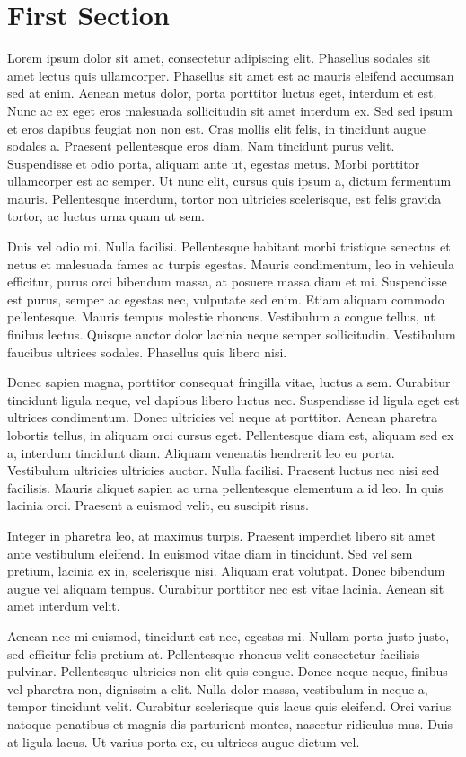 \documentclass{report}
\begin{document}
	\section{First Section}
	
	Lorem ipsum dolor sit amet, consectetur adipiscing elit. Phasellus sodales sit amet lectus quis ullamcorper. Phasellus sit amet est ac mauris eleifend accumsan sed at enim. Aenean metus dolor, porta porttitor luctus eget, interdum et est. Nunc ac ex eget eros malesuada sollicitudin sit amet interdum ex. Sed sed ipsum et eros dapibus feugiat non non est. Cras mollis elit felis, in tincidunt augue sodales a. Praesent pellentesque eros diam. Nam tincidunt purus velit. Suspendisse et odio porta, aliquam ante ut, egestas metus. Morbi porttitor ullamcorper est ac semper. Ut nunc elit, cursus quis ipsum a, dictum fermentum mauris. Pellentesque interdum, tortor non ultricies scelerisque, est felis gravida tortor, ac luctus urna quam ut sem.
	
	Duis vel odio mi. Nulla facilisi. Pellentesque habitant morbi tristique senectus et netus et malesuada fames ac turpis egestas. Mauris condimentum, leo in vehicula efficitur, purus orci bibendum massa, at posuere massa diam et mi. Suspendisse est purus, semper ac egestas nec, vulputate sed enim. Etiam aliquam commodo pellentesque. Mauris tempus molestie rhoncus. Vestibulum a congue tellus, ut finibus lectus. Quisque auctor dolor lacinia neque semper sollicitudin. Vestibulum faucibus ultrices sodales. Phasellus quis libero nisi.
	
	Donec sapien magna, porttitor consequat fringilla vitae, luctus a sem. Curabitur tincidunt ligula neque, vel dapibus libero luctus nec. Suspendisse id ligula eget est ultrices condimentum. Donec ultricies vel neque at porttitor. Aenean pharetra lobortis tellus, in aliquam orci cursus eget. Pellentesque diam est, aliquam sed ex a, interdum tincidunt diam. Aliquam venenatis hendrerit leo eu porta. Vestibulum ultricies ultricies auctor. Nulla facilisi. Praesent luctus nec nisi sed facilisis. Mauris aliquet sapien ac urna pellentesque elementum a id leo. In quis lacinia orci. Praesent a euismod velit, eu suscipit risus.
	
	Integer in pharetra leo, at maximus turpis. Praesent imperdiet libero sit amet ante vestibulum eleifend. In euismod vitae diam in tincidunt. Sed vel sem pretium, lacinia ex in, scelerisque nisi. Aliquam erat volutpat. Donec bibendum augue vel aliquam tempus. Curabitur porttitor nec est vitae lacinia. Aenean sit amet interdum velit.
	
	Aenean nec mi euismod, tincidunt est nec, egestas mi. Nullam porta justo justo, sed efficitur felis pretium at. Pellentesque rhoncus velit consectetur facilisis pulvinar. Pellentesque ultricies non elit quis congue. Donec neque neque, finibus vel pharetra non, dignissim a elit. Nulla dolor massa, vestibulum in neque a, tempor tincidunt velit. Curabitur scelerisque quis lacus quis eleifend. Orci varius natoque penatibus et magnis dis parturient montes, nascetur ridiculus mus. Duis at ligula lacus. Ut varius porta ex, eu ultrices augue dictum vel.
\end{document}
